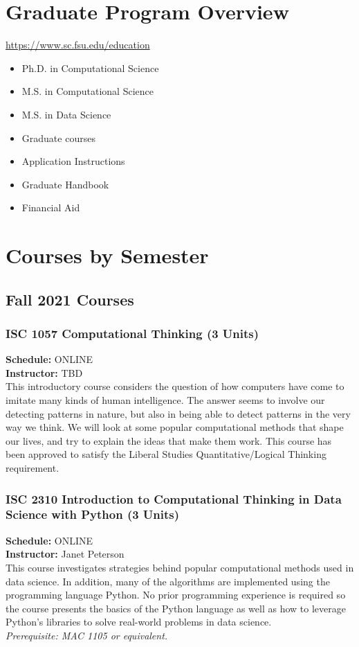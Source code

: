 \documentclass[12pt,a4paper]{article}
\begin{document}
\section{Graduate Program Overview}
\url{https://www.sc.fsu.edu/education}
\begin{itemize}
    \item Ph.D. in Computational Science
    \item M.S. in Computational Science
    \item M.S. in Data Science
    \item Graduate courses
    \item Application Instructions
    \item Graduate Handbook
    \item Financial Aid
\end{itemize}

\section{Courses by Semester}

\subsection{Fall 2021 Courses}
\subsubsection*{ISC 1057 Computational Thinking (3 Units)}
\textbf{Schedule:} ONLINE \\
\textbf{Instructor:} TBD \\
This introductory course considers the question of how computers have come to imitate many kinds of human intelligence. The answer seems to involve our detecting patterns in nature, but also in being able to detect patterns in the very way we think. We will look at some popular computational methods that shape our lives, and try to explain the ideas that make them work. This course has been approved to satisfy the Liberal Studies Quantitative/Logical Thinking requirement.

\subsubsection*{ISC 2310 Introduction to Computational Thinking in Data Science with Python (3 Units)}
\textbf{Schedule:} ONLINE \\
\textbf{Instructor:} Janet Peterson \\
This course investigates strategies behind popular computational methods used in data science. In addition, many of the algorithms are implemented using the programming language Python. No prior programming experience is required so the course presents the basics of the Python language as well as how to leverage Python’s libraries to solve real-world problems in data science. \\
\textit{Prerequisite: MAC 1105 or equivalent.}
\end{document}

